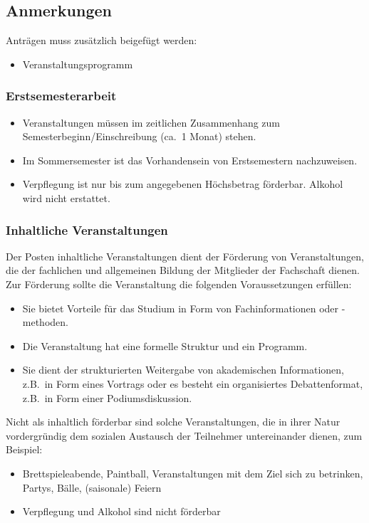 \documentclass{article}
\begin{document}
    \subsection{Anmerkungen}
    Anträgen muss zusätzlich beigefügt werden:
    \begin{itemize}
        \item Veranstaltungsprogramm
    \end{itemize}
        \subsubsection{Erstsemesterarbeit}
        \begin{itemize}
            \item Veranstaltungen müssen im zeitlichen Zusammenhang zum Semesterbeginn/Einschreibung (ca.\ 1 Monat) stehen.
            \item Im Sommersemester ist das Vorhandensein von Erstsemestern nachzuweisen.
            \item Verpflegung ist nur bis zum angegebenen Höchsbetrag förderbar. 
            	Alkohol wird nicht erstattet.
        \end{itemize}
        
        \subsubsection{Inhaltliche Veranstaltungen}   
        Der Posten inhaltliche Veranstaltungen dient der Förderung von Veranstaltungen, die der fachlichen und allgemeinen Bildung der Mitglieder der Fachschaft dienen.
        Zur Förderung sollte die Veranstaltung die folgenden Voraussetzungen erfüllen:
        \begin{itemize}
            \item Sie bietet Vorteile für das Studium in Form von Fachinformationen oder -methoden.
            \item Die Veranstaltung hat eine formelle Struktur und ein Programm.
            \item Sie dient der strukturierten Weitergabe von akademischen Informationen, z.B.\ in Form eines Vortrags oder es besteht ein organisiertes Debattenformat, z.B.\ in Form einer Podiumsdiskussion.
        \end{itemize}

        Nicht als inhaltlich förderbar sind solche Veranstaltungen, die in ihrer Natur vordergründig dem sozialen Austausch der Teilnehmer untereinander dienen, zum Beispiel:
        \begin{itemize}
            \item Brettspieleabende,
            Paintball,
            Veranstaltungen mit dem Ziel sich zu betrinken,
            Partys,
            Bälle,
            (saisonale) Feiern
            \item Verpflegung und Alkohol sind nicht förderbar
        \end{itemize}
        
\end{document}
